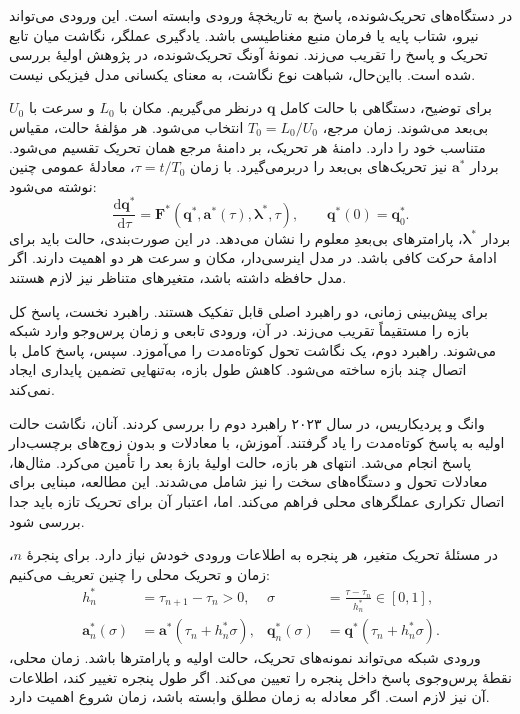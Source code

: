 \label{sec:lit-temporal-forcing-operators}

در دستگاه‌های تحریک‌شونده، پاسخ به تاریخچهٔ ورودی وابسته است.
این ورودی می‌تواند نیرو، شتاب پایه یا فرمان منبع مغناطیسی باشد.
یادگیری عملگر، نگاشت میان تابع تحریک و پاسخ را تقریب می‌زند.
نمونهٔ آونگ تحریک‌شونده، در پژوهش اولیهٔ  بررسی شده است.
بااین‌حال، شباهت نوع نگاشت، به معنای یکسانی مدل فیزیکی نیست.
\cite{lu2021deeponet}

برای توضیح، دستگاهی با حالت کامل $\mathbf{q}$ درنظر می‌گیریم.
مکان با $L_0$ و سرعت با $U_0$ بی‌بعد می‌شوند.
زمان مرجع، $T_0=L_0/U_0$ انتخاب می‌شود.
هر مؤلفهٔ حالت، مقیاس متناسب خود را دارد.
دامنهٔ هر تحریک، بر دامنهٔ مرجع همان تحریک تقسیم می‌شود.
بردار $\mathbf{a}^{*}$ نیز تحریک‌های بی‌بعد را دربرمی‌گیرد.
با زمان $\tau=t/T_0$، معادلهٔ عمومی چنین نوشته می‌شود:
\begin{equation}
\frac{\mathrm{d}\mathbf{q}^{*}}{\mathrm{d}\tau}
=\mathbf{F}^{*}\!\left(
\mathbf{q}^{*},\mathbf{a}^{*}(\tau),\boldsymbol{\lambda}^{*},\tau
\right),
\qquad
\mathbf{q}^{*}(0)=\mathbf{q}^{*}_{0}.
\label{eq:lit-forced-dimensionless-ode}
\end{equation}
بردار $\boldsymbol{\lambda}^{*}$، پارامترهای بی‌بعدِ معلوم را نشان می‌دهد.
در این صورت‌بندی، حالت باید برای ادامهٔ حرکت کافی باشد.
در مدل اینرسی‌دار، مکان و سرعت هر دو اهمیت دارند.
اگر مدل حافظه داشته باشد، متغیرهای متناظر نیز لازم هستند.

برای پیش‌بینی زمانی، دو راهبرد اصلی قابل تفکیک هستند.
راهبرد نخست، پاسخ کل بازه را مستقیماً تقریب می‌زند.
در آن، ورودی تابعی و زمان پرس‌وجو وارد شبکه می‌شوند.
راهبرد دوم، یک نگاشت تحول کوتاه‌مدت را می‌آموزد.
سپس، پاسخ کامل با اتصال چند بازه ساخته می‌شود.
کاهش طول بازه، به‌تنهایی تضمین پایداری ایجاد نمی‌کند.

وانگ و پردیکاریس، در سال ۲۰۲۳ راهبرد دوم را بررسی کردند.
آنان، نگاشت حالت اولیه به پاسخ کوتاه‌مدت را یاد گرفتند.
آموزش، با معادلات و بدون زوج‌های برچسب‌دار پاسخ انجام می‌شد.
انتهای هر بازه، حالت اولیهٔ بازهٔ بعد را تأمین می‌کرد.
مثال‌ها، معادلات تحول و دستگاه‌های سخت را نیز شامل می‌شدند.
این مطالعه، مبنایی برای اتصال تکراری عملگرهای محلی فراهم می‌کند.
اما، اعتبار آن برای تحریک تازه باید جدا بررسی شود.
\cite{Wang2023LongTime}

در مسئلهٔ تحریک متغیر، هر پنجره به اطلاعات ورودی خودش نیاز دارد.
برای پنجرهٔ $n$، زمان و تحریک محلی را چنین تعریف می‌کنیم:
\begin{equation}
\begin{aligned}
h_n^{*}&=\tau_{n+1}-\tau_n>0,
&\sigma&=\frac{\tau-\tau_n}{h_n^{*}}\in[0,1],\\
\mathbf{a}^{*}_{n}(\sigma)
&=\mathbf{a}^{*}(\tau_n+h_n^{*}\sigma),
&\mathbf{q}^{*}_{n}(\sigma)
&=\mathbf{q}^{*}(\tau_n+h_n^{*}\sigma).
\end{aligned}
\label{eq:lit-temporal-window-coordinates}
\end{equation}
ورودی شبکه می‌تواند نمونه‌های تحریک، حالت اولیه و پارامترها باشد.
زمان محلی، نقطهٔ پرس‌وجوی پاسخ داخل پنجره را تعیین می‌کند.
اگر طول پنجره تغییر کند، اطلاعات آن نیز لازم است.
اگر معادله به زمان مطلق وابسته باشد، زمان شروع اهمیت دارد.

